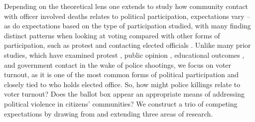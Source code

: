 \documentclass[12pt]{article}
\newcommand{\kscomment}[1]{\textbf{\textcolor{Thistle}{[[ #1 --- KS ]]}}}
\begin{document}
Depending on the theoretical lens one extends to study how community contact with officer involved deaths relates to political participation, expectations vary -- as do expectations based on the type of participation studied, with many finding distinct patterns when looking at voting compared with other forms of participation, such as protest and contacting elected officials \citep[e.g., ][]{walker2020mobilized}. 
Unlike many prior studies, which have examined protest \citep{williamson2018black}, public opinion \citep{Reny2021,wasow2020agenda}, educational outcomes \citep{ang2021effects}, and government contact \citep{cohen2019officer} in the wake of police shootings, we focus on voter turnout, as it is one of the most common forms of political participation and closely tied to who holds elected office. 
So, how might police killings relate to voter turnout? Does the ballot box appear an appropriate means of addressing political violence in citizens' communities? We construct a trio of competing expectations by drawing from and extending three areas of research. %
\end{document}
